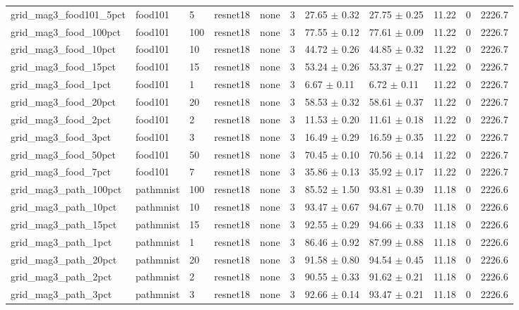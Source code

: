 \begin{tabular}{lllllllllll}
grid_mag3_food101_5pct & food101 & 5 & resnet18 & none & 3 & 27.65 $\pm$ 0.32 & 27.75 $\pm$ 0.25 & 11.22 & 0 & 2226.7 \\
grid_mag3_food_100pct & food101 & 100 & resnet18 & none & 3 & 77.55 $\pm$ 0.12 & 77.61 $\pm$ 0.09 & 11.22 & 0 & 2226.7 \\
grid_mag3_food_10pct & food101 & 10 & resnet18 & none & 3 & 44.72 $\pm$ 0.26 & 44.85 $\pm$ 0.32 & 11.22 & 0 & 2226.7 \\
grid_mag3_food_15pct & food101 & 15 & resnet18 & none & 3 & 53.24 $\pm$ 0.26 & 53.37 $\pm$ 0.27 & 11.22 & 0 & 2226.7 \\
grid_mag3_food_1pct & food101 & 1 & resnet18 & none & 3 & 6.67 $\pm$ 0.11 & 6.72 $\pm$ 0.11 & 11.22 & 0 & 2226.7 \\
grid_mag3_food_20pct & food101 & 20 & resnet18 & none & 3 & 58.53 $\pm$ 0.32 & 58.61 $\pm$ 0.37 & 11.22 & 0 & 2226.7 \\
grid_mag3_food_2pct & food101 & 2 & resnet18 & none & 3 & 11.53 $\pm$ 0.20 & 11.61 $\pm$ 0.18 & 11.22 & 0 & 2226.7 \\
grid_mag3_food_3pct & food101 & 3 & resnet18 & none & 3 & 16.49 $\pm$ 0.29 & 16.59 $\pm$ 0.35 & 11.22 & 0 & 2226.7 \\
grid_mag3_food_50pct & food101 & 50 & resnet18 & none & 3 & 70.45 $\pm$ 0.10 & 70.56 $\pm$ 0.14 & 11.22 & 0 & 2226.7 \\
grid_mag3_food_7pct & food101 & 7 & resnet18 & none & 3 & 35.86 $\pm$ 0.13 & 35.92 $\pm$ 0.17 & 11.22 & 0 & 2226.7 \\
grid_mag3_path_100pct & pathmnist & 100 & resnet18 & none & 3 & 85.52 $\pm$ 1.50 & 93.81 $\pm$ 0.39 & 11.18 & 0 & 2226.6 \\
grid_mag3_path_10pct & pathmnist & 10 & resnet18 & none & 3 & 93.47 $\pm$ 0.67 & 94.67 $\pm$ 0.70 & 11.18 & 0 & 2226.6 \\
grid_mag3_path_15pct & pathmnist & 15 & resnet18 & none & 3 & 92.55 $\pm$ 0.29 & 94.66 $\pm$ 0.33 & 11.18 & 0 & 2226.6 \\
grid_mag3_path_1pct & pathmnist & 1 & resnet18 & none & 3 & 86.46 $\pm$ 0.92 & 87.99 $\pm$ 0.88 & 11.18 & 0 & 2226.6 \\
grid_mag3_path_20pct & pathmnist & 20 & resnet18 & none & 3 & 91.58 $\pm$ 0.80 & 94.54 $\pm$ 0.45 & 11.18 & 0 & 2226.6 \\
grid_mag3_path_2pct & pathmnist & 2 & resnet18 & none & 3 & 90.55 $\pm$ 0.33 & 91.62 $\pm$ 0.21 & 11.18 & 0 & 2226.6 \\
grid_mag3_path_3pct & pathmnist & 3 & resnet18 & none & 3 & 92.66 $\pm$ 0.14 & 93.47 $\pm$ 0.21 & 11.18 & 0 & 2226.6 \\

\end{tabular}
